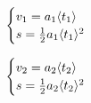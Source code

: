 \begin{equation} \begin{cases}v_{1}=a_1\langle t_{1}\rangle\\ s=\frac{1}{2}a_{1}\langle t_{1}\rangle^{2}\\ \end{cases}\ \\  \end{equation}

\begin{equation} \begin{cases}v_{2}=a_2\langle t_{2}\rangle\\ s=\frac{1}{2}a_{2}\langle t_{2}\rangle^{2}\\ \end{cases}\ \\  \end{equation}